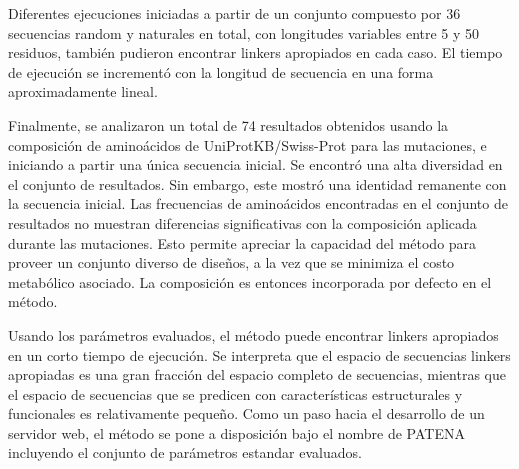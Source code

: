 Diferentes ejecuciones iniciadas a partir de un conjunto compuesto por 36 secuencias random y naturales en total, 
con longitudes variables entre 5 y 50 residuos, también pudieron encontrar linkers apropiados en cada caso.
El tiempo de ejecución se incrementó con la longitud de secuencia en una forma aproximadamente lineal.






Finalmente, se analizaron un total de 74 resultados obtenidos usando la composición de aminoácidos de UniProtKB/Swiss-Prot para las mutaciones, e iniciando a partir una única secuencia inicial.
Se encontró una alta diversidad en el conjunto de resultados. Sin embargo, este mostró una identidad remanente con la secuencia inicial.
Las frecuencias de aminoácidos encontradas en el conjunto de resultados no muestran diferencias significativas con la composición aplicada durante las mutaciones.
Esto permite apreciar la capacidad del método para proveer un conjunto diverso de diseños, a la vez que se minimiza el costo metabólico asociado.
La composición es entonces incorporada por defecto en el método.




Usando los parámetros evaluados, el método puede encontrar linkers apropiados en un corto tiempo de ejecución.
Se interpreta que el espacio de secuencias linkers apropiadas es una gran fracción del espacio completo de secuencias, 
mientras que el espacio de secuencias que se predicen con características estructurales y funcionales es relativamente pequeño.
Como un paso hacia el desarrollo de un servidor web, el método se pone a disposición bajo el nombre de PATENA incluyendo el conjunto de parámetros estandar evaluados.